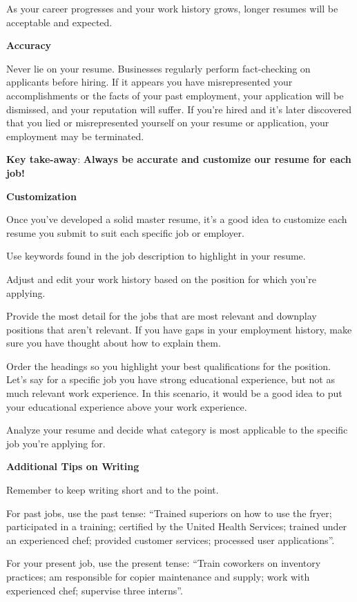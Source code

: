 As your career progresses and your work history grows, longer resumes will be acceptable and expected.

 \textbf{Accuracy}

Never lie on your resume. Businesses regularly perform fact-checking on applicants before hiring. If it appears you have misrepresented your accomplishments or the facts of your past employment, your application will be dismissed, and your reputation will suffer. If you're hired and it's later discovered that you lied or misrepresented yourself on your resume or application, your employment may be terminated.

\textbf{Key take-away}:
\break \textbf{Always be accurate and customize our resume for each job!}

\textbf{Customization}

Once you've developed a solid master resume, it's a good idea to customize each resume you submit to suit each specific job or employer.

Use keywords found in the job description to highlight in your resume.

Adjust and edit your work history based on the position for which you're applying.

Provide the most detail for the jobs that are most relevant and downplay positions that aren't relevant. If you have gaps in your employment history, make sure you have thought about how to explain them.

Order the headings so you highlight your best qualifications for the position. Let's say for a specific job you have strong educational experience, but not as much relevant work experience. In this scenario, it would be a good idea to put your educational experience above your work experience.

Analyze your resume and decide what category is most applicable to the specific job you're applying for. 

\textbf{Additional Tips on Writing}

Remember to keep writing short and to the point.

For past jobs, use the past tense: ``Trained superiors on how to use the fryer; participated in a training; certified by the United Health Services; trained under an experienced chef; provided customer services; processed user applications''.

For your present job, use the present tense: ``Train coworkers on inventory practices; am responsible for copier maintenance and supply; work with experienced chef; supervise three interns''.


